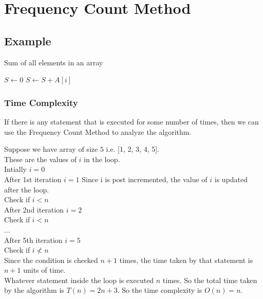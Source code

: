 \documentclass[twocolumn]{article}
\begin{document}
\section{Frequency Count Method}
\subsection{Example}
\noindent
\begin{algorithm}
\caption{Sum of all elements in an array}\label{sum}
\begin{algorithmic}
\State$S \gets 0$ 
 
    \State$S \gets S + A[i]$
\EndFor\EndProcedure\end{algorithmic}
\end{algorithm}

\subsubsection{Time Complexity}
\noindent
If there is any statement that is executed for some number of times, then we can use the Frequency Count Method to analyze the algorithm.

Suppose we have array of size $5$ i.e. [1, 2, 3, 4, 5]. \\
These are the values of $i$ in the loop. \\
Intially $i = 0$ \\
After 1st iteration $i = 1$  Since i is post incremented, the value of $i$ is updated after the loop. \\
Check if $i < n$ \\
After 2nd iteration $i = 2$ \\
Check if $i < n$ \\
... \\
After 5th iteration $i = 5$ \\
Check if $i \not< n$ \\ 
\noindent
Since the condition is checked $n+1$ times, the time taken by that statement is $n+1$ units of time. \\
Whatever statement inside the loop is executed $n$ times. 
So the total time taken by the algorithm is $T(n) = 2n + 3$. So the time complexity is $O(n) = n$.
\end{document}

